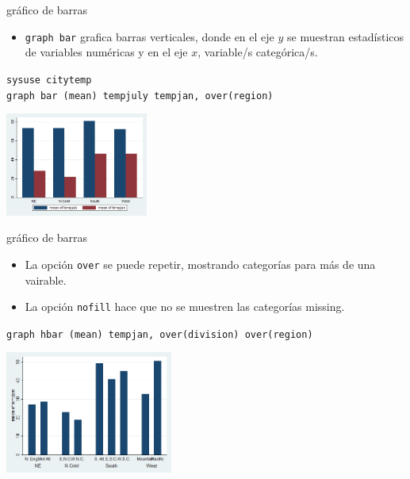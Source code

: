 \documentclass{beamer}
\begin{document}
\begin{frame}{gráfico de barras}
\begin{itemize}
\item \texttt{graph bar} grafica barras verticales, donde en el eje $y$ se muestran estadísticos de variables numéricas y en el eje $x$, variable/s categórica/s.
\end{itemize}
{\footnotesize \texttt{sysuse citytemp}}\\
{\footnotesize \texttt{graph bar (mean) tempjuly tempjan, over(region)}}\\\medskip
\centerline{\includegraphics[height=3.4cm]{bar.png}}
\end{frame}

\begin{frame}{gráfico de barras}
\begin{itemize}
\item La opción \texttt{over} se puede repetir, mostrando categorías para más de una vairable.
\item La opción \texttt{nofill} hace que no se muestren las categorías missing.
\end{itemize}
{\footnotesize \texttt{graph hbar (mean) tempjan, over(division) over(region)}}\\\medskip
\centerline{\includegraphics[height=4cm]{bar1.png}}
\end{frame}
\end{document}
